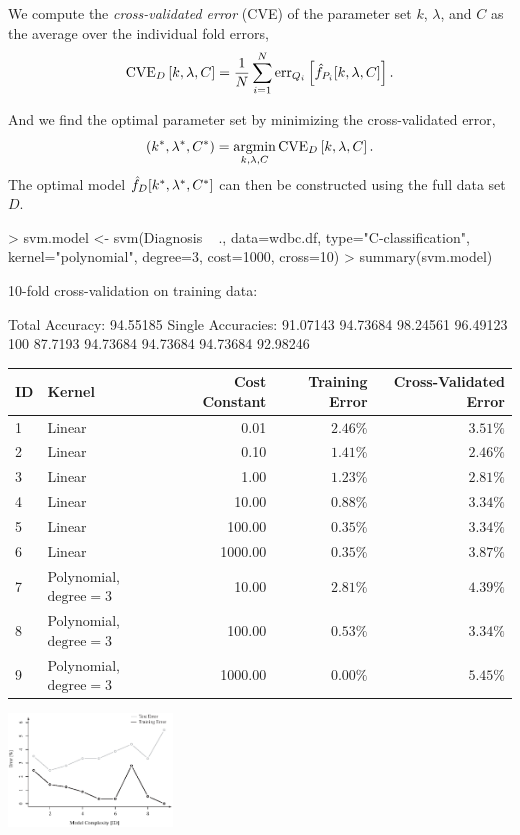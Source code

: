 \documentclass[a4paper,blends,pdf,colorBG,slideColor]{prosper}
\begin{document}
\es


We compute the {\em cross-validated error} (CVE) of the parameter set $k$, $\lambda$, and
$C$ as the average over the individual fold errors,
\begin{equation*}
\text{CVE}_D\left [k,\lambda,C \right ] 
	= \frac{1}{N} \sum_{i=1}^N \mbox{err}_{Q_i}\left [\hat{f}_{P_i}[k,\lambda,C]\right].
\end{equation*}

And we find the optimal parameter set by minimizing the
cross-validated error,
\begin{equation*}
(k^*,\lambda^*,C^*) = \argmin_{k,\lambda,C} \text{CVE}_D\left [k,\lambda,C \right ] .
\end{equation*}
The optimal model $\hat{f}_D[k^*,\lambda^*,C^*]$ can then be constructed using 
the full data set $D$.

\es

\vspace{.2in}
\scriptsize
\begin{Rcode}
> svm.model <- svm(Diagnosis ~ ., 
                   data=wdbc.df, 
                   type="C-classification",
                   kernel="polynomial", 
                   degree=3, 
                   cost=1000,
                   {\color{red}cross=10})
> summary(svm.model)

{\color{red}10-fold cross-validation on training data:}

Total Accuracy: 94.55185 
Single Accuracies:
 91.07143 94.73684 98.24561 96.49123 100 
 87.7193 94.73684 94.73684 94.73684 92.98246 
\end{Rcode}
\es

\scriptsize
   \begin{tabular*}{\textwidth}{@{\extracolsep{\fill}} llrrr}
      \toprule
       ID & Kernel & Cost Constant & Training Error & Cross-Validated Error\\
      \midrule
     1& Linear & 0.01&   $2.46\%$& $3.51\%$ \\
     2& Linear & 0.10&    $1.41\%$ & $2.46\%$ \\
      3&Linear & 1.00 &   $1.23\%$ & $2.81\%$\\
      4&Linear & 10.00 &   $0.88\%$ & $3.34\%$\\
      5&Linear & 100.00 &   $0.35\%$ & $3.34\%$\\
      6&Linear & 1000.00 &   $0.35\%$ & $3.87\%$\\
      7&Polynomial, $\text{degree}=3$ & 10.00 & $2.81\%$ & $4.39\%$\\
      8&Polynomial, $\text{degree}=3$ & 100.00 & $0.53\%$ & $3.34\%$\\
      9&Polynomial, $\text{degree}=3$ & 1000.00 & $0.00\%$ & $5.45\%$\\
      \bottomrule
   \end{tabular*}

\begin{center}
\includegraphics[height=30mm]{figures/fig09-05.eps}
\end{center}
\es
\end{document}
